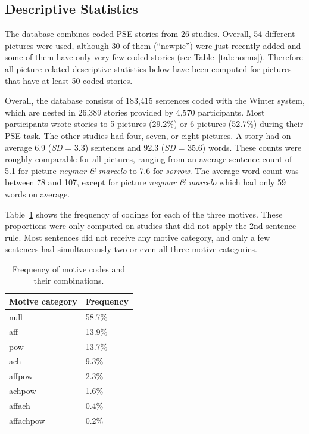 \documentclass[man,a4paper,mask]{apa6}\usepackage[]{graphicx}\usepackage[]{color}
\begin{document}
\begin{table}
\begin{tabularx}{\textwidth}{XXrrrl}
		\bottomrule
		\end{tabularx}
\end{table}

\subsection{Descriptive Statistics}

The database combines coded PSE stories from 26 studies. Overall, 54 different pictures were used, although 30 of them (``newpic'') were just recently added and some of them have only very few coded stories (see Table~\ref{tab:norms}). Therefore all picture-related descriptive statistics below have been computed for pictures that have at least 50 coded stories.

Overall, the database consists of 183,415 sentences coded with the Winter system, which are nested in 26,389 stories provided by 4,570 participants. Most participants wrote stories to 5 pictures (29.2\%) or 6 pictures (52.7\%) during their PSE task. The other studies had four, seven, or eight pictures. A story had on average 6.9 (\emph{SD} = 3.3) sentences and 92.3 (\emph{SD} = 35.6) words. These counts were roughly comparable for all pictures, ranging from an average sentence count of 5.1 for picture \emph{neymar \& marcelo} to 7.6 for \emph{sorrow}. The average word count was between 78 and 107, except for picture \emph{neymar \& marcelo} which had only 59 words on average.


Table~\ref{tab:motcat} shows the frequency of codings for each of the three motives. These proportions were only computed on studies that did not apply the 2nd-sentence-rule. Most sentences did not receive any motive category, and only a few sentences had simultaneously two or even all three motive categories.

\begin{table}[ht]
\centering
\caption{Frequency of motive codes and their combinations.} 
\label{tab:motcat}
\begin{tabular}{ll}
  \hline
Motive category & Frequency \\ 
  \hline
null & 58.7\% \\ 
  aff & 13.9\% \\ 
  pow & 13.7\% \\ 
  ach & 9.3\% \\ 
  affpow & 2.3\% \\ 
  achpow & 1.6\% \\ 
  affach & 0.4\% \\ 
  affachpow & 0.2\% \\ 
   \hline
\end{tabular}
\end{table}
\end{document}
